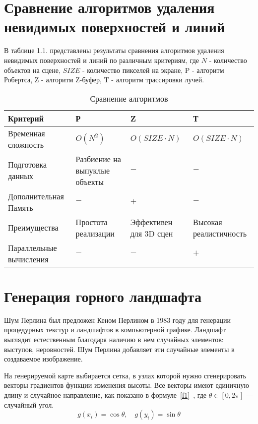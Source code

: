 \section{Сравнение алгоритмов удаления невидимых поверхностей и линий}
В таблице 1.1. представлены результаты сравнения алгоритмов удаления невидимых поверхностей и линий по различным критериям, где 
$N$ - количество объектов на сцене, $SIZE$ - количество пикселей на экране, P - алгоритм Робертса, Z - алгоритм Z-буфер, T - алгоритм трассировки лучей. 

\begin{table}[h!]
        \small
        \captionsetup{justification=raggedright, singlelinecheck=false, labelsep=endash}
		\caption{Сравнение алгоритмов}
		
		\label{tbl:comparing_algorithms}
		\begin{tabular}{|p{3cm}|p{3cm}|p{3cm}|p{5cm}|}
			 \hline 
             Критерий & Р & Z & Т \\ 
             \hline 
             Временная сложность & $O(N^2)$ & $O(SIZE \cdot N)$ & $O(SIZE \cdot N)$ \\
             \hline
             Подготовка данных & Разбиение на выпуклые объекты & $-$ & $-$ \\
             \hline
             Дополнительная Память & $-$ & $+$ & $-$ \\
             \hline
             Преимущества & Простота реализации & Эффективен для 3D сцен & Высокая реалистичность \\
             \hline
             Параллельные вычисления & $-$ & $-$ & $+$ \\ 
             \hline
		\end{tabular}
\end{table}

\section{Генерация горного ландшафта}
Шум Перлина был предложен Кеном Перлином в 1983 году для генерации процедурных текстур и ландшафтов в компьютерной графике. Ландшафт выглядит естественным благодаря наличию в нем случайных элементов: выступов, неровностей. Шум Перлина добавляет эти случайные элементы в создаваемое изображение.

На генерируемой карте выбирается сетка, в узлах которой нужно сгенерировать векторы градиентов функции изменения высоты. Все векторы имеют единичную длину и случайное направление, как показано в формуле~\ref{f1}~\cite{real_time}, где $\theta \in [0, 2\pi]$ --- случайный угол.
\begin{equation}
g(x_i) = \cos{\theta} , \quad
g(y_i) = \sin{\theta}
\label{f1}
\end{equation}

